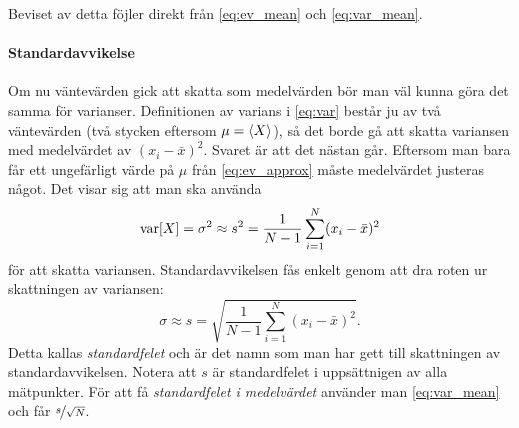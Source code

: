 \documentclass[11pt,a4paper, swedish
]{article}
\newcommand{\VAR}[1]{\ensuremath\text{var}\!\left[#1\right]}
\begin{document}
Beviset av detta föjler direkt från \eqref{eq:ev_mean}
och \eqref{eq:var_mean}. 

\paragraph{Standardavvikelse}
Om nu väntevärden gick att skatta som medelvärden bör man väl kunna
göra det samma för varianser. Definitionen av varians i \eqref{eq:var}
består ju av två väntevärden (två stycken eftersom $\mu=\ev{X}$), så
det borde gå att skatta variansen med medelvärdet av
$(x_i-\bar{x})^2$. Svaret är att det  nästan går. Eftersom man bara
får ett ungefärligt värde på $\mu$ från \eqref{eq:ev_approx} måste
medelvärdet justeras något. Det visar sig att man ska använda
\begin{equation}\label{eq:var_approx}
\VAR{X} = \sigma^2 \approx s^2 = \frac{1}{N-1}\sum_{i=1}^N (x_i-\bar{x})^2
\end{equation}
för att skatta variansen. Standardavvikelsen fås enkelt genom att dra
roten ur skattningen av variansen:
\begin{equation}\label{eq:std_approx}
\sigma \approx s = \sqrt{\frac{1}{N-1}\sum_{i=1}^N (x_i-\bar{x})^2}.
\end{equation}
Detta kallas \emph{standardfelet} och är det namn som man har gett
till skattningen av standardavvikelsen.
Notera att $s$ är standardfelet i uppsättnigen av alla
mätpunkter. För att få \emph{standardfelet i medelvärdet}
använder man \eqref{eq:var_mean} och får $\nicefrac{s}{\sqrt{N}}$.
\end{document}
